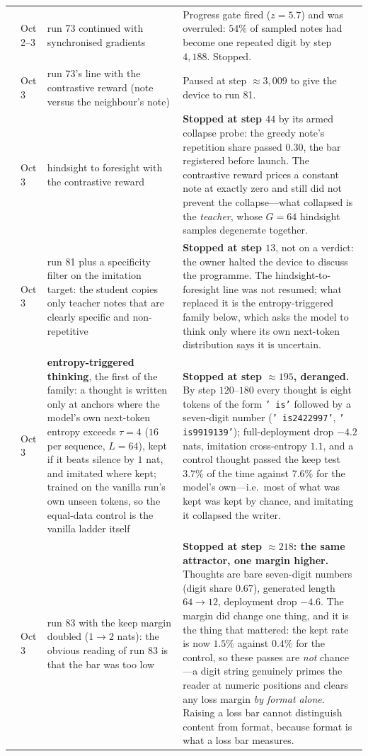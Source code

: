 \documentclass{article} %
\begin{document}
{\begin{longtable}{@{}llp{3.6cm}p{5.6cm}@{}}
\addlinespace
79 & Oct 2--3 & run 73 continued with synchronised gradients & Progress gate fired ($z = 5.7$) and was overruled: $54\%$ of sampled notes had become one repeated digit by step $4{,}188$. Stopped. \\
\addlinespace
80 & Oct 3 & run 73's line with the contrastive reward (note versus the neighbour's note) & Paused at step ${\approx}3{,}009$ to give the device to run 81. \\
\addlinespace
81 & Oct 3 & hindsight to foresight with the contrastive reward & \textbf{Stopped at step $44$} by its armed collapse probe: the greedy note's repetition share passed $0.30$, the bar registered before launch. The contrastive reward prices a constant note at exactly zero and still did not prevent the collapse---what collapsed is the \emph{teacher}, whose $G=64$ hindsight samples degenerate together. \\
\addlinespace
82 & Oct 3 & run 81 plus a specificity filter on the imitation target: the student copies only teacher notes that are clearly specific and non-repetitive & \textbf{Stopped at step $13$}, not on a verdict: the owner halted the device to discuss the programme. The hindsight-to-foresight line was not resumed; what replaced it is the entropy-triggered family below, which asks the model to think only where its own next-token distribution says it is uncertain. \\
\addlinespace
83 & Oct 3 & \textbf{entropy-triggered thinking}, the first of the family: a thought is written only at anchors where the model's own next-token entropy exceeds $\tau = 4$ ($16$ per sequence, $L = 64$), kept if it beats silence by $1$ nat, and imitated where kept; trained on the vanilla run's own unseen tokens, so the equal-data control is the vanilla ladder itself & \textbf{Stopped at step ${\approx}195$, deranged.} By step $120$--$180$ every thought is eight tokens of the form \texttt{' is'} followed by a seven-digit number (\texttt{' is2422997'}, \texttt{' is9919139'}); full-deployment drop $-4.2$ nats, imitation cross-entropy $1.1$, and a control thought passed the keep test $3.7\%$ of the time against $7.6\%$ for the model's own---i.e.\ most of what was kept was kept by chance, and imitating it collapsed the writer. \\
\addlinespace
84 & Oct 3 & run 83 with the keep margin doubled ($1 \to 2$ nats): the obvious reading of run 83 is that the bar was too low & \textbf{Stopped at step ${\approx}218$: the same attractor, one margin higher.} Thoughts are bare seven-digit numbers (digit share $0.67$), generated length $64 \to 12$, deployment drop $-4.6$. The margin did change one thing, and it is the thing that mattered: the kept rate is now $1.5\%$ against $0.4\%$ for the control, so these passes are \emph{not} chance---a digit string genuinely primes the reader at numeric positions and clears any loss margin \emph{by format alone}. Raising a loss bar cannot distinguish content from format, because format is what a loss bar measures. \\

\end{longtable}}
\end{document}
